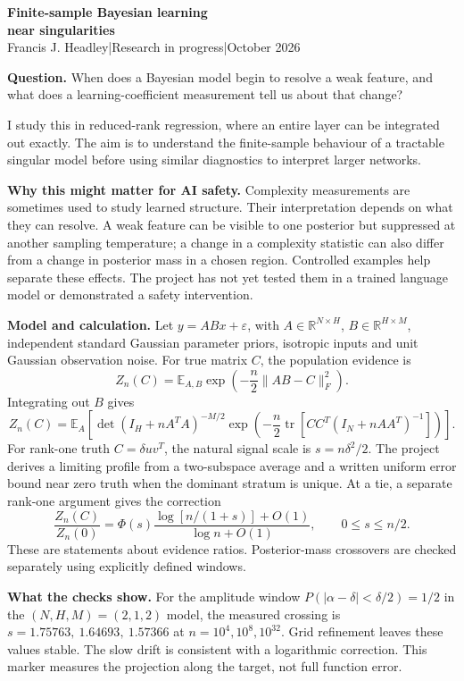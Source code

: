 \documentclass[11pt,a4paper]{article}
\begin{document}
\begin{center}
{\Large\bfseries Finite-sample Bayesian learning\\near singularities}\\[7pt]
Francis J. Headley\quad |\quad Research in progress\quad |\quad October 2026
\end{center}
\vspace{3pt}
\textbf{Question.} When does a Bayesian model begin to resolve a weak feature, and what does a learning-coefficient measurement tell us about that change?

I study this in reduced-rank regression, where an entire layer can be integrated out exactly. The aim is to understand the finite-sample behaviour of a tractable singular model before using similar diagnostics to interpret larger networks.

\textbf{Why this might matter for AI safety.} Complexity measurements are sometimes used to study learned structure. Their interpretation depends on what they can resolve. A weak feature can be visible to one posterior but suppressed at another sampling temperature; a change in a complexity statistic can also differ from a change in posterior mass in a chosen region. Controlled examples help separate these effects. The project has not yet tested them in a trained language model or demonstrated a safety intervention.

\textbf{Model and calculation.} Let $y=ABx+\varepsilon$, with $A\in\mathbb R^{N\times H}$, $B\in\mathbb R^{H\times M}$, independent standard Gaussian parameter priors, isotropic inputs and unit Gaussian observation noise. For true matrix $C$, the population evidence is
\[
Z_n(C)=\mathbb E_{A,B}\exp\!\left(-\frac n2\|AB-C\|_F^2\right).
\]
Integrating out $B$ gives
\[
Z_n(C)=\mathbb E_A\!\left[\det(I_H+nA^TA)^{-M/2}
\exp\!\left(-\frac n2\operatorname{tr}\!\left[CC^T(I_N+nAA^T)^{-1}\right]\right)\right].
\]
For rank-one truth $C=\delta uv^T$, the natural signal scale is $s=n\delta^2/2$. The project derives a limiting profile from a two-subspace average and a written uniform error bound near zero truth when the dominant stratum is unique. At a tie, a separate rank-one argument gives the correction
\[
\frac{Z_n(C)}{Z_n(0)}=
\Phi(s)\frac{\log[n/(1+s)]+O(1)}{\log n+O(1)},\qquad 0\le s\le n/2.
\]
These are statements about evidence ratios. Posterior-mass crossovers are checked separately using explicitly defined windows.

\textbf{What the checks show.} For the amplitude window $P(|\alpha-\delta|<\delta/2)=1/2$ in the $(N,H,M)=(2,1,2)$ model, the measured crossing is $s=1.75763,\ 1.64693,\ 1.57366$ at $n=10^4,10^8,10^{32}$. Grid refinement leaves these values stable. The slow drift is consistent with a logarithmic correction. This marker measures the projection along the target, not full function error.
\end{document}
